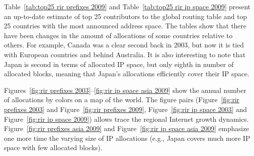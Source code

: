 Table~\ref{tab:top25 rir prefixes 2009} and Table~\ref{tab:top25 rir ip space
2009} present an up-to-date estimate of top 25 contributors to the global
routing table and top 25 countries with the most announced address space. The
tables show that there have been changes in the amount of allocations of some
countries relative to others. For example, Canada was a clear second back in
2003, but now it is tied with European countries and behind Australia. It is
also interesting to note that Japan is second in terms of allocated IP space,
but only eighth in number of allocated blocks, meaning that Japan's
allocations efficiently cover their IP space.

Figures~\ref{fig:rir prefixes 2003}--\ref{fig:rir ip space asia 2009} show the
annual number of allocations by colors on a map of the world. The figure pairs
(Figure~\ref{fig:rir prefixes 2003} and Figure~\ref{fig:rir prefixes 2009},
Figure~\ref{fig:rir ip space 2003} and Figure~\ref{fig:rir ip space 2009})
allows trace the regional Internet growth dynamics. Figure~\ref{fig:rir
prefixes asia 2009} and Figure~\ref{fig:rir ip space asia 2009} emphasize one
more time the varying size of IP allocations (e.g., Japan covers much more IP
space with few allocated blocks).




